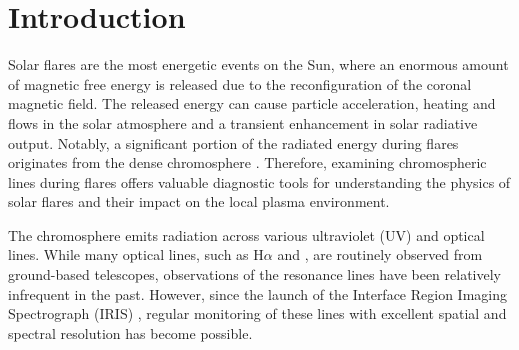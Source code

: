 
    
\justifying

\section{Introduction} \label{sec:intro}

Solar flares are the most energetic events on the Sun, where an enormous amount of magnetic free energy is released due to the reconfiguration of the coronal magnetic field. The released energy can cause particle acceleration, heating and flows in the solar atmosphere and a transient enhancement in solar radiative output. Notably, a significant portion of the radiated energy during flares originates from the dense chromosphere \citep{fletcher10,milligan14}. Therefore, examining chromospheric lines during flares offers valuable diagnostic tools for understanding the physics of solar flares and their impact on the local plasma environment.

The chromosphere emits radiation across various ultraviolet (UV) and optical lines. While many optical lines, such as H$\alpha$ and , are routinely observed from ground-based telescopes, observations of the   resonance lines have been relatively infrequent in the past. However, since the launch of the Interface Region Imaging Spectrograph (IRIS) \citep{iris}, regular monitoring of these lines with excellent spatial and spectral resolution has become possible.

